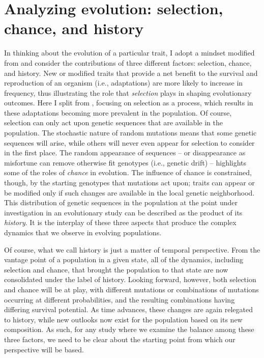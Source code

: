 \section{Analyzing evolution: selection, chance, and history}

In thinking about the evolution of a particular trait, I adopt a mindset modified from \citet{travisanoExperimentalTestsRoles1995} and consider the contributions of three different factors: selection, chance, and history.
New or modified traits that provide a net benefit to the survival and reproduction of an organism (i.e., adaptations) are more likely to increase in frequency, thus illustrating the role that \textit{selection} plays in shaping evolutionary outcomes. 
Here I split from \citet{travisanoExperimentalTestsRoles1995}, focusing on selection as a process, which results in these adaptations becoming more prevalent in the population.
Of course, selection can only act upon genetic sequences that are available in the population.
The stochastic nature of random mutations means that some genetic sequences will arise, while others will never even appear for selection to consider in the first place.
The random appearance of sequences -- or disappearance as misfortune can remove otherwise fit genotypes (i.e., genetic drift) -- highlights some of the roles of \textit{chance} in evolution.
The influence of chance is constrained, though, by the starting genotypes that mutations act upon; traits can appear or be modified only if such changes are available in the local genetic neighborhood.
This distribution of genetic sequences in the population at the point under investigation in an evolutionary study can be described as the product of its \textit{history}.
It is the interplay of these three aspects that produce the complex dynamics that we observe in evolving populations.

Of course, what we call history is just a matter of temporal perspective.
From the vantage point of a population in a given state, all of the dynamics, including selection and chance, that brought the population to that state are now consolidated under the label of history.
Looking forward, however, both selection and chance will be at play, with different mutations or combinations of mutations occurring at different probabilities, and the resulting combinations having differing survival potential.
As time advances, these changes are again relegated to history, while new outlooks now exist for the population based on its new composition.
As such, for any study where we examine the balance among these three factors, we need to be clear about the starting point from which our perspective will be based.

